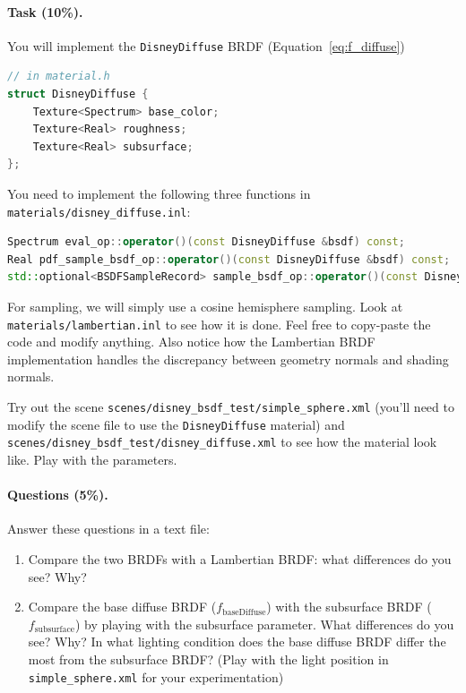\paragraph{Task (10\%).} You will implement the \lstinline{DisneyDiffuse} BRDF (Equation~\ref{eq:f_diffuse})
\begin{lstlisting}[language=c++]
// in material.h
struct DisneyDiffuse {
    Texture<Spectrum> base_color;
    Texture<Real> roughness;
    Texture<Real> subsurface;
};
\end{lstlisting}

You need to implement the following three functions in \lstinline{materials/disney_diffuse.inl}:
\begin{lstlisting}[language=c++]
Spectrum eval_op::operator()(const DisneyDiffuse &bsdf) const;
Real pdf_sample_bsdf_op::operator()(const DisneyDiffuse &bsdf) const;
std::optional<BSDFSampleRecord> sample_bsdf_op::operator()(const DisneyDiffuse &bsdf) const;
\end{lstlisting}

For sampling, we will simply use a cosine hemisphere sampling. Look at \lstinline{materials/lambertian.inl} to see how it is done. Feel free to copy-paste the code and modify anything. Also notice how the Lambertian BRDF implementation handles the discrepancy between geometry normals and shading normals.

Try out the scene \lstinline{scenes/disney_bsdf_test/simple_sphere.xml} (you'll need to modify the scene file to use the \lstinline{DisneyDiffuse} material) and \lstinline{scenes/disney_bsdf_test/disney_diffuse.xml} to see how the material look like. Play with the parameters.

\paragraph{Questions (5\%).} Answer these questions in a text file:
\begin{enumerate}
	\item Compare the two BRDFs with a Lambertian BRDF: what differences do you see? Why?
	\item Compare the base diffuse BRDF ($f_{\text{baseDiffuse}}$) with the subsurface BRDF ($f_{\text{subsurface}}$) by playing with the subsurface parameter. What differences do you see? Why? In what lighting condition does the base diffuse BRDF differ the most from the subsurface BRDF? (Play with the light position in \lstinline{simple_sphere.xml} for your experimentation)
\end{enumerate}

